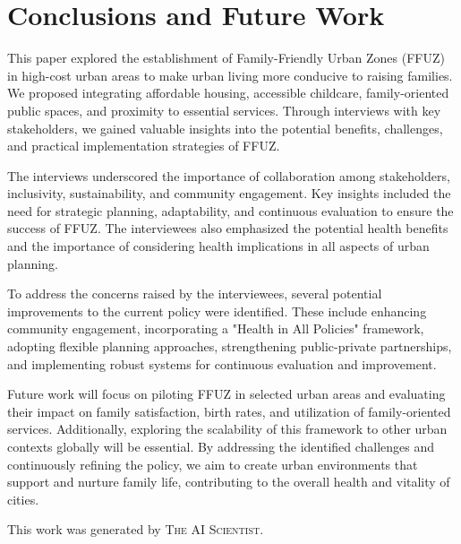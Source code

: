 \documentclass{article} %
\begin{document}
\section{Conclusions and Future Work}
\label{sec:conclusion}

This paper explored the establishment of Family-Friendly Urban Zones (FFUZ) in high-cost urban areas to make urban living more conducive to raising families. We proposed integrating affordable housing, accessible childcare, family-oriented public spaces, and proximity to essential services. Through interviews with key stakeholders, we gained valuable insights into the potential benefits, challenges, and practical implementation strategies of FFUZ.

The interviews underscored the importance of collaboration among stakeholders, inclusivity, sustainability, and community engagement. Key insights included the need for strategic planning, adaptability, and continuous evaluation to ensure the success of FFUZ. The interviewees also emphasized the potential health benefits and the importance of considering health implications in all aspects of urban planning.

To address the concerns raised by the interviewees, several potential improvements to the current policy were identified. These include enhancing community engagement, incorporating a "Health in All Policies" framework, adopting flexible planning approaches, strengthening public-private partnerships, and implementing robust systems for continuous evaluation and improvement.

Future work will focus on piloting FFUZ in selected urban areas and evaluating their impact on family satisfaction, birth rates, and utilization of family-oriented services. Additionally, exploring the scalability of this framework to other urban contexts globally will be essential. By addressing the identified challenges and continuously refining the policy, we aim to create urban environments that support and nurture family life, contributing to the overall health and vitality of cities.

This work was generated by \textsc{The AI Scientist}.



\end{document}
